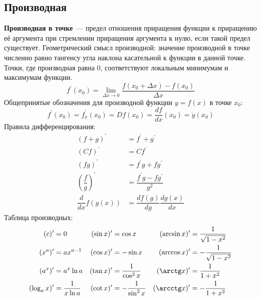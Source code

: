 \subsection{Производная}
\textbf{Производная в точке}~--- предел отношения приращения функции к приращению её аргумента при стремлении приращения аргумента к нулю, если такой предел существует. Геометрический смысл производной: значение производной в точке численно равно тангенсу угла наклона касательной к функции в данной точке. Точки, где производная равна 0, соответствуют локальным минимумам и максимумам функции.
\begin{equation}
f^\prime(x_0) = \lim_{\Delta x \to 0}\frac{f(x_0 + \Delta x) - f(x_0)}{\Delta x}
\end{equation}
Общепринятые обозначения для производной функции $y = f(x)$ в точке $x_0$:
\begin{equation}
f^\prime(x_0) = f^\prime_x(x_0) = D f(x_0) = \frac{d f}{d x}(x_0) = \dot{y} (x_0)
\end{equation}
Правила дифференцирования:
\begin{align*}
(f+g)^\prime &= f^\prime + g^\prime\\
(Cf)^\prime &= Cf^\prime\\
(fg)^\prime &= f^\prime g + f g^\prime\\
\left(\dfrac{f}{g}\right)^\prime &= \dfrac{f^\prime g - f g^\prime}{g^2}\\
\dfrac{d}{dx}f(g(x)) &= \dfrac{df(g)}{dg}\dfrac{dg(x)}{dx}
\end{align*}
Таблица производных:
\begin{align*}
(c)^\prime &= 0 & (\sin x)^\prime &= \cos x & (\arcsin x)^\prime &= \dfrac{1}{\sqrt{1 - x^2}} \\
(x^a)^\prime &= a x^{a-1} & (\cos x)^\prime &= - \sin x & (\arccos x)^\prime &= - \dfrac{1}{\sqrt{1 - x^2}} \\
(a^x)^\prime &= a^x \ln a & (\tan x)^\prime &= \dfrac{1}{\cos^2 x} & (\arctg x)^\prime &= \dfrac{1}{1 + x^2} \\
(\log_a x)^\prime &= \dfrac{1}{x \ln a} & (\cot x)^\prime &= - \dfrac{1}{\sin^2 x} & (\arcctg x)^\prime &= - \dfrac{1}{1 + x^2} 
\end{align*}

